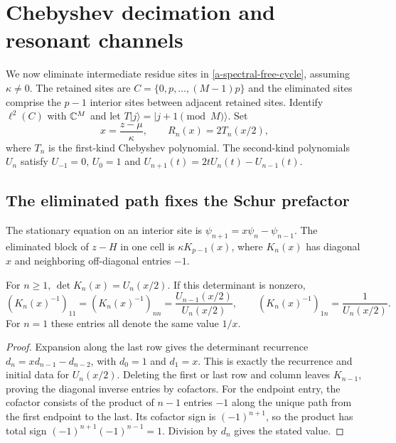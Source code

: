 \section{Chebyshev decimation and resonant channels}
\label{a-spectral-chebyshev}

We now eliminate intermediate residue sites in
\eqref{a-spectral-free-cycle}, assuming $\kappa\ne0$. The retained
sites are $C=\{0,p,\ldots,(M-1)p\}$ and the eliminated sites comprise
the $p-1$ interior sites between adjacent retained sites. Identify
$\ell^2(C)$ with $\mathbb C^M$ and let $T|j\rangle=|j+1\pmod M\rangle$.
Set
\begin{equation}
 x=\frac{z-\mu}{\kappa},\qquad
 R_n(x)=2T_n(x/2),
 \label{a-spectral-normalized-energy}
\end{equation}
where $T_n$ is the first-kind Chebyshev polynomial. The second-kind
polynomials $U_n$ satisfy $U_{-1}=0$, $U_0=1$ and
$U_{n+1}(t)=2tU_n(t)-U_{n-1}(t)$.

\subsection{The eliminated path fixes the Schur prefactor}

The stationary equation on an interior site is
$\psi_{n+1}=x\psi_n-\psi_{n-1}$. The eliminated block of $z-H$ in
one cell is $\kappa K_{p-1}(x)$, where $K_n(x)$ has diagonal $x$
and neighboring off-diagonal entries $-1$.

\begin{lemma}
\label{a-spectral-path-inverse}
For $n\geq1$, $\det K_n(x)=U_n(x/2)$. If this determinant is nonzero,
\[
 (K_n(x)^{-1})_{11}=(K_n(x)^{-1})_{nn}
       =\frac{U_{n-1}(x/2)}{U_n(x/2)},\qquad
 (K_n(x)^{-1})_{1n}=\frac1{U_n(x/2)}.
\]
For $n=1$ these entries all denote the same value $1/x$.
\end{lemma}
\begin{proof}
Expansion along the last row gives the determinant recurrence
$d_n=xd_{n-1}-d_{n-2}$, with $d_0=1$ and $d_1=x$.
This is exactly the recurrence and initial data for $U_n(x/2)$.
Deleting the first or last row and column leaves $K_{n-1}$, proving
the diagonal inverse entries by cofactors. For the endpoint entry,
the cofactor consists of the product of $n-1$ entries $-1$ along the
unique path from the first endpoint to the last. Its cofactor sign is
$(-1)^{n+1}$, so the product has total sign
$(-1)^{n+1}(-1)^{n-1}=1$. Division by $d_n$ gives the stated value.
\end{proof}

